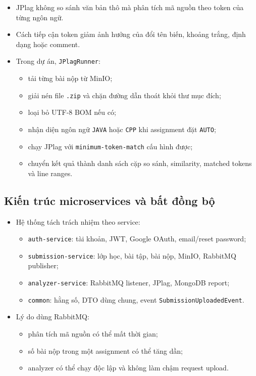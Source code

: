 \documentclass[12pt,a4paper]{article}
\begin{document}
\begin{itemize}
    \item JPlag không so sánh văn bản thô mà phân tích mã nguồn theo token của từng ngôn ngữ.
    \item Cách tiếp cận token giảm ảnh hưởng của đổi tên biến, khoảng trắng, định dạng hoặc comment.
    \item Trong dự án, \texttt{JPlagRunner}:
    \begin{itemize}
        \item tải từng bài nộp từ MinIO;
        \item giải nén file \texttt{.zip} và chặn đường dẫn thoát khỏi thư mục đích;
        \item loại bỏ UTF-8 BOM nếu có;
        \item nhận diện ngôn ngữ \texttt{JAVA} hoặc \texttt{CPP} khi assignment đặt \texttt{AUTO};
        \item chạy JPlag với \texttt{minimum-token-match} cấu hình được;
        \item chuyển kết quả thành danh sách cặp so sánh, similarity, matched tokens và line ranges.
    \end{itemize}
\end{itemize}

\subsection{Kiến trúc microservices và bất đồng bộ}

\begin{itemize}
    \item Hệ thống tách trách nhiệm theo service:
    \begin{itemize}
        \item \texttt{auth-service}: tài khoản, JWT, Google OAuth, email/reset password;
        \item \texttt{submission-service}: lớp học, bài tập, bài nộp, MinIO, RabbitMQ publisher;
        \item \texttt{analyzer-service}: RabbitMQ listener, JPlag, MongoDB report;
        \item \texttt{common}: hằng số, DTO dùng chung, event \texttt{SubmissionUploadedEvent}.
    \end{itemize}
    \item Lý do dùng RabbitMQ:
    \begin{itemize}
        \item phân tích mã nguồn có thể mất thời gian;
        \item số bài nộp trong một assignment có thể tăng dần;
        \item analyzer có thể chạy độc lập và không làm chậm request upload.
    \end{itemize}
\end{itemize}
\end{document}
